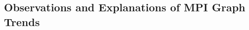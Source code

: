 \documentclass{article}
\begin{document}
    
    \subsection{Observations and Explanations of MPI Graph Trends}
    
    
    
\end{document}
